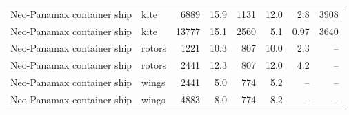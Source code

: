 \begin{tabular}{@{}llrrrrrr@{}}
Neo-Panamax container ship & kite & 6889 & 15.9 & 1131 & 12.0 & 2.8 & 3908 \\
Neo-Panamax container ship & kite & 13777 & 15.1 & 2560 & 5.1 & 0.97 & 3640 \\
Neo-Panamax container ship & rotors & 1221 & 10.3 & 807 & 10.0 & 2.3 & -- \\
Neo-Panamax container ship & rotors & 2441 & 12.3 & 807 & 12.0 & 4.2 & -- \\
Neo-Panamax container ship & wings & 2441 & 5.0 & 774 & 5.2 & -- & -- \\
Neo-Panamax container ship & wings & 4883 & 8.0 & 774 & 8.2 & -- & -- \\
\bottomrule
\end{tabular}
